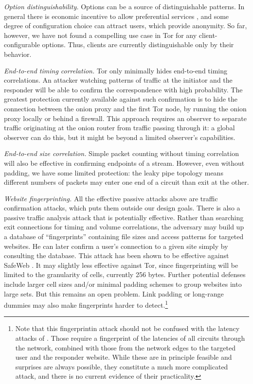 \documentclass[times,10pt,twocolumn]{article}
\begin{document}
\emph{Option distinguishability.} Options can be a
source of distinguishable patterns. In general there is economic
incentive to allow preferential services \cite{econymics}, and some
degree of configuration choice can attract users, which
provide anonymity.  So far, however, we have
not found a compelling use case in Tor for any client-configurable
options.  Thus, clients are currently distinguishable only by their
behavior.
  
\emph{End-to-end timing correlation.}  Tor only minimally hides
end-to-end timing correlations. An attacker watching patterns of
traffic at the initiator and the responder will be
able to confirm the correspondence with high probability. The
greatest protection currently available against such confirmation is to hide
the connection between the onion proxy and the first Tor node,
by running the onion proxy locally or 
behind a firewall.  This approach
requires an observer to separate traffic originating at the onion
router from traffic passing through it: a global observer can do this,
but it might be beyond a limited observer's capabilities.
  
\emph{End-to-end size correlation.} Simple packet counting
without timing correlation will also be effective in confirming
endpoints of a stream. However, even without padding, we have some
limited protection: the leaky pipe topology means different numbers
of packets may enter one end of a circuit than exit at the other.
  
\emph{Website fingerprinting.} All the effective passive
attacks above are traffic confirmation attacks,
which puts them outside our design goals. There is also
a passive traffic analysis attack that is potentially effective.
Rather than searching exit connections for timing and volume
correlations, the adversary may build up a database of
``fingerprints'' containing file sizes and access patterns for 
targeted websites. He can later confirm a user's connection to a given
site simply by consulting the database. This attack has
been shown to be effective against SafeWeb \cite{hintz-pet02}.
It may slightly less effective against Tor, since
fingerprinting will be limited to
the granularity of cells, currently 256 bytes.  Further potential
defenses include 
larger cell sizes and/or minimal padding schemes to group websites
into large sets. But this remains an open problem.  Link
padding or long-range dummies may also make fingerprints harder to
detect.\footnote{Note that
this fingerprintin attack should not be confused with the latency attacks
of \cite{back01}. Those require a fingerprint of the latencies of
all circuits through the network, combined with those from the
network edges to the targeted user and the responder website. While
these are in principle feasible and surprises are always possible,
they constitute a much more complicated attack, and there is no
current evidence of their practicality.}\\
\end{document}
